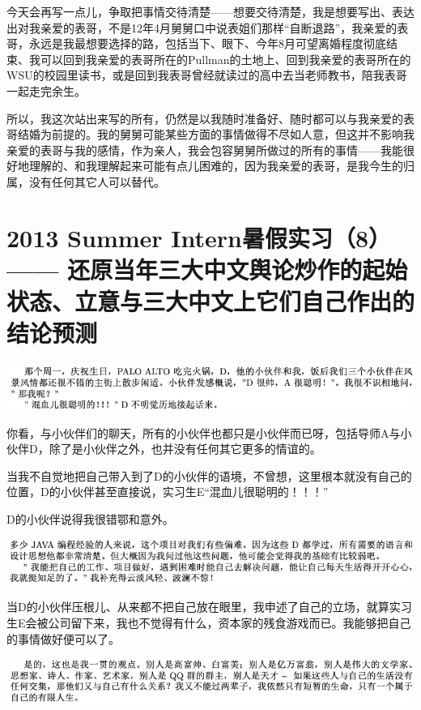\documentclass[9pt, b5paper]{article}
\begin{document}
今天会再写一点儿，争取把事情交待清楚——想要交待清楚，我是想要写出、表达出对我亲爱的表哥，不是12年4月舅舅口中说表姐们那样“自断退路”，我亲爱的表哥，永远是我最想要选择的路，包括当下、眼下、今年8月可望离婚程度彻底结束、我可以回到我亲爱的表哥所在的Pullman的土地上、回到我亲爱的表哥所在的WSU的校园里读书，或是回到我表哥曾经就读过的高中去当老师教书，陪我表哥一起走完余生。

所以，我这次站出来写的所有，仍然是以我随时准备好、随时都可以与我亲爱的表哥结婚为前提的。我的舅舅可能某些方面的事情做得不尽如人意，但这并不影响我亲爱的表哥与我的感情，作为亲人，我会包容舅舅所做过的所有的事情——我能很好地理解的、和我理解起来可能有点儿困难的，因为我亲爱的表哥，是我今生的归属，没有任何其它人可以替代。 

\section{2013 Summer Intern暑假实习（8）—— 还原当年三大中文舆论炒作的起始状态、立意与三大中文上它们自己作出的结论预测}
\label{sec:org08b9336}

\begin{center}
\includegraphics[width=.9\linewidth]{./pic/backups_plans_20210514_121334.png}
\end{center}

你看，与小伙伴们的聊天，所有的小伙伴也都只是小伙伴而已呀，包括导师A与小伙伴D，除了是小伙伴之外，也并没有任何其它更多的情谊的。 

当我不自觉地把自己带入到了D的小伙伴的语境，不曾想，这里根本就没有自己的位置，D的小伙伴甚至直接说，实习生E“混血儿很聪明的！！！”

D的小伙伴说得我很错鄂和意外。 

\begin{center}
\includegraphics[width=.9\linewidth]{./pic/backups_plans_20210514_121704.png}
\end{center}

当D的小伙伴压根儿、从来都不把自己放在眼里，我申述了自己的立场，就算实习生E会被公司留下来，我也不觉得有什么，资本家的残食游戏而已。我能够把自己的事情做好便可以了。 

\begin{center}
\includegraphics[width=.9\linewidth]{./pic/backups_plans_20210514_122038.png}
\end{center}
\end{document}
